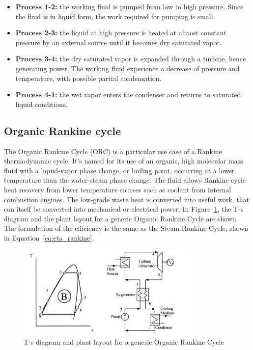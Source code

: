 \begin{itemize}
  \item \textbf{Process 1-2:} the working fluid is pumped from low to high pressure. Since the fluid is in liquid form, the work required for pumping is small.
  \item \textbf{Process 2-3:} the liquid at high pressure is heated at almost constant pressure by an external source until it becomes dry saturated vapor.
  \item \textbf{Process 3-4:} the dry saturated vapor is expanded through a turbine, hence generating power. The working fluid experience a decrease of pressure and temperature, with possible partial condensation.
  \item \textbf{Process 4-1:} the wet vapor enters the condenser and returns to saturated liquid conditions.
\end{itemize}



\subsection{Organic Rankine cycle}

The Organic Rankine Cycle (ORC) is a particular use case of a Rankine thermodynamic cycle. It's named for its use of an organic, high molecular mass fluid with a liquid-vapor phase change, or boiling point, occurring at a lower temperature than the water-steam phase change. The fluid allows Rankine cycle heat recovery from lower temperature sources such as coolant from internal combustion engines. The low-grade waste heat is converted into useful work, that can itself be converted into mechanical or electrical power. In Figure~\ref{fig:orc_diagram}, the T-s diagram and the plant layout for a generic Organic Rankine Cycle are shown. The formulation of the efficiency is the same as the Steam Rankine Cycle, shown in Equation~\ref{eq:eta_rankine}.

\begin{figure}[ht]
  \centering
  \includegraphics[width=0.8\textwidth]{figures/review/orc.jpg}
  \caption{T-s diagram and plant layout for a generic Organic Rankine Cycle\label{fig:orc_diagram} }
\end{figure}

